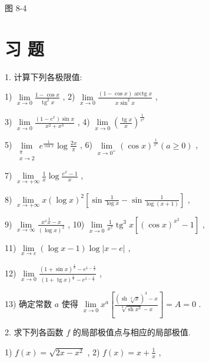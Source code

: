 图 8-4

\section*{习 题}

1. 计算下列各极限值:

1) $\mathop{\lim }\limits_{{x \rightarrow  0}}\frac{1 - \cos x}{{\operatorname{tg}}^{2}x}$ , 2) $\mathop{\lim }\limits_{{x \rightarrow  0}}\frac{\left( {1 - \cos x}\right) \operatorname{arctg}x}{x{\sin }^{2}x}$ ,

3) $\mathop{\lim }\limits_{{x \rightarrow  0}}\frac{\left( {1 - {e}^{x}}\right) \sin x}{{x}^{2} + {x}^{3}}$ , 4) $\mathop{\lim }\limits_{{x \rightarrow  0}}{\left( \frac{\operatorname{tg}x}{x}\right) }^{\frac{1}{{x}^{2}}}$

5) $\mathop{\lim }\limits_{\substack{\pi \\  x \rightarrow  2 }}{e}^{\frac{1}{\cos x}}\log \frac{2x}{\pi }$ , 6) $\mathop{\lim }\limits_{{x \rightarrow  {0}^{ + }}}{\left( \cos x\right) }^{\frac{1}{{x}^{a}}}\left( {a \geq  0}\right)$ ,

7) $\mathop{\lim }\limits_{{x \rightarrow   + \infty }}\frac{1}{x}\log \frac{{e}^{x} - 1}{x}$ ,

8) $\mathop{\lim }\limits_{{x \rightarrow   + \infty }}x{\left( \log x\right) }^{2}\left\lbrack  {\sin \frac{1}{\log x} - \sin \frac{1}{\log \left( {x + 1}\right) }}\right\rbrack$ ,

9) $\mathop{\lim }\limits_{{x \rightarrow  \infty }}\frac{{x}^{x}\overset{1}{x} - x}{{\left( \log x\right) }^{2}}$ , 10) $\mathop{\lim }\limits_{{x \rightarrow  0}}\frac{1}{{x}^{7}}{\operatorname{tg}}^{3}x\left\lbrack  {{\left( \cos x\right) }^{{x}^{2}} - 1}\right\rbrack$ ,

11) $\mathop{\lim }\limits_{{x \rightarrow  e}}\left( {\log x - 1}\right) \log \left| {x - e}\right|$ ,

12) $\mathop{\lim }\limits_{{x \rightarrow  0}}\frac{{\left( 1 + \sin x\right) }^{\frac{1}{x}} - {e}^{1 - \frac{x}{2}}}{{\left( 1 + \operatorname{tg}x\right) }^{\frac{1}{x}} - {e}^{1 - \frac{x}{2}}}$ ,

13) 确定常数 $a$ 使得 $\mathop{\lim }\limits_{{x \rightarrow  0}}{x}^{a}\left\lbrack  \frac{{\left( \operatorname{sh}\sqrt[3]{x}\right) }^{3} - x}{\sqrt[3]{\operatorname{sh}{x}^{3}} - x}\right\rbrack   = A = 0$ .

2. 求下列各函数 $f$ 的局部极值点与相应的局部极值.

1) $f\left( x\right)  = \sqrt{{2x} - {x}^{2}}$ , 2) $f\left( x\right)  = x + \frac{1}{x}$ ,

